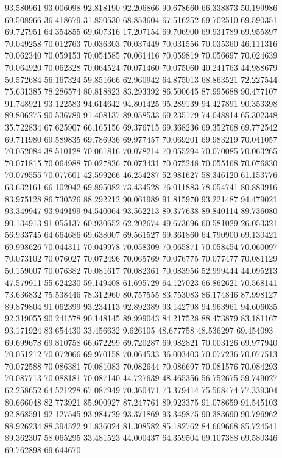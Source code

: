 93.580961
93.006098
92.818190
92.206866
90.678660
66.338873
50.199986
69.508966
36.418679
31.850530
68.853604
67.516252
69.702510
69.590351
69.727951
64.354855
69.607316
17.207154
69.706900
69.931789
69.955897
70.049258
70.012763
70.036303
70.037449
70.031556
70.035360
46.111316
70.062340
70.059153
70.054585
70.061416
70.059819
70.056697
70.024639
70.064920
70.062328
70.064524
70.071460
70.075060
40.241763
44.988679
50.572684
56.167324
59.851666
62.960942
64.875013
68.863521
72.227544
75.631385
78.286574
80.818823
83.293392
86.500645
87.995688
90.477107
91.748921
93.122583
94.614642
94.801425
95.289139
94.427891
90.353398
89.806275
90.536789
91.408137
89.058533
69.235179
74.048814
65.302348
35.722834
67.625907
66.165156
69.376715
69.368236
69.352768
69.772542
69.711980
69.589835
69.786936
69.977457
70.069201
69.983219
70.041057
70.052084
38.510128
70.061816
70.078214
70.055294
70.070085
70.063265
70.071815
70.064988
70.027836
70.073431
70.075248
70.055168
70.076830
70.079555
70.077601
42.599266
46.254287
52.981627
58.346120
61.153776
63.632161
66.102042
69.895082
73.434528
76.011883
78.054741
80.883916
83.975128
86.730526
88.292212
90.061989
91.815970
93.221487
94.479021
93.349947
93.949199
94.540064
93.562213
89.377638
89.840114
89.736080
90.134913
91.055137
60.930652
62.202674
49.673696
60.581029
26.053321
56.933745
64.664686
69.638007
69.561527
69.361860
64.790900
69.130421
69.998626
70.044311
70.049978
70.058309
70.065871
70.058454
70.060097
70.073102
70.076027
70.072496
70.065769
70.076775
70.077477
70.081129
50.159007
70.076382
70.081617
70.082361
70.083956
52.999444
44.095213
47.579911
55.624230
59.149408
61.695729
64.127023
66.862621
70.568141
73.636832
75.538446
78.312960
80.757555
83.753083
86.174846
87.998127
89.879804
91.062399
93.234113
92.892389
93.142798
94.963961
94.606035
92.319055
90.241578
90.148145
89.999043
84.217528
88.473879
83.181167
93.171924
83.654430
33.456632
9.626105
48.677758
48.536297
69.454093
69.699678
69.810758
66.672299
69.720287
69.982821
70.003126
69.977940
70.051212
70.072066
69.970158
70.064533
36.003403
70.077236
70.077513
70.072588
70.086381
70.081083
70.082644
70.086697
70.081576
70.084293
70.087713
70.088181
70.087140
44.727639
48.465356
56.752675
59.749027
62.258652
64.521228
67.087949
70.360471
73.379414
75.568474
77.339304
80.666048
82.773921
85.900927
87.247761
89.923375
91.078659
91.545103
92.868591
92.127545
93.984729
93.371869
93.349875
90.383690
90.796962
88.926234
88.394522
91.836024
81.308582
85.182762
84.669668
85.724541
89.362307
58.065295
33.481523
44.000437
64.359504
69.107388
69.580346
69.762898
69.644670
